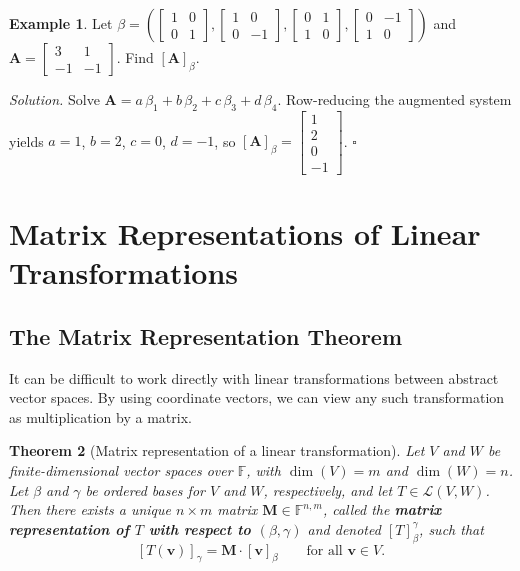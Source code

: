 \documentclass[11pt, a4paper, notitlepage]{report}
\newtheorem{theorem}{Theorem}[section]
\theoremstyle{definition}
\newtheorem{example}[theorem]{Example}
\theoremstyle{remark}
\begin{document}
\begin{example}\label{ex:coord-R22}
Let $\beta = \left(\begin{bmatrix}1&0\\0&1\end{bmatrix}, \begin{bmatrix}1&0\\0&-1\end{bmatrix}, \begin{bmatrix}0&1\\1&0\end{bmatrix}, \begin{bmatrix}0&-1\\1&0\end{bmatrix}\right)$ and $\mathbf{A} = \begin{bmatrix}3&1\\-1&-1\end{bmatrix}$.
Find $[\mathbf{A}]_\beta$.

\emph{Solution.} Solve $\mathbf{A} = a\,\beta_1 + b\,\beta_2 + c\,\beta_3 + d\,\beta_4$.
Row-reducing the augmented system yields $a=1$, $b=2$, $c=0$, $d=-1$, so
$[\mathbf{A}]_\beta = \begin{bmatrix}1\\2\\0\\-1\end{bmatrix}$. $\square$
\end{example}

\section{Matrix Representations of Linear Transformations}
\label{sec:matrix-reps}

\subsection{The Matrix Representation Theorem}

It can be difficult to work directly with linear transformations between abstract vector spaces.
By using coordinate vectors, we can view any such transformation as multiplication by a matrix.

\begin{theorem}[Matrix representation of a linear transformation]\label{thm:matrix-rep}
Let $V$ and $W$ be finite-dimensional vector spaces over $\mathbb{F}$, with $\dim(V) = m$ and
$\dim(W) = n$. Let $\beta$ and $\gamma$ be ordered bases for $V$ and $W$, respectively, and let
$T \in \mathcal{L}(V,W)$. Then there exists a unique $n \times m$ matrix
$\mathbf{M} \in \mathbb{F}^{n,m}$, called the \textbf{matrix representation of $T$ with respect to
$(\beta, \gamma)$} and denoted $[T]_\beta^\gamma$, such that
\[
  [T(\mathbf{v})]_\gamma = \mathbf{M} \cdot [\mathbf{v}]_\beta \qquad \text{for all } \mathbf{v} \in V.
\]
\end{theorem}
\end{document}

